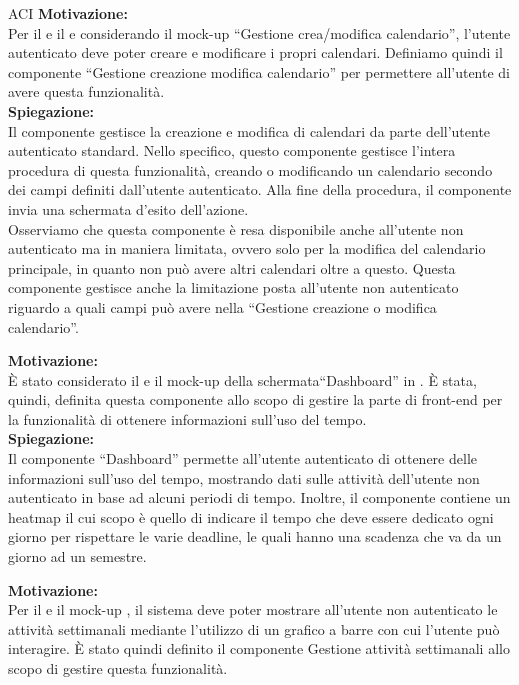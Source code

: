 \begin{listaPersonale}{ACI}
    \textbf{Motivazione:}\\
    Per il  e il  e considerando il mock-up  “Gestione crea/modifica calendario”, l'utente autenticato deve poter creare e modificare i propri calendari.
    Definiamo quindi il componente “Gestione creazione modifica calendario” per permettere all'utente di avere questa funzionalità.\\
    \textbf{Spiegazione:} \\Il componente gestisce la creazione e modifica di calendari da parte dell'utente autenticato standard. Nello specifico, questo componente gestisce l'intera procedura di questa funzionalità, creando o modificando un calendario secondo dei campi definiti dall'utente autenticato. Alla fine della procedura, il componente invia una schermata d'esito dell'azione.\\
    Osserviamo che questa componente è resa disponibile anche all'utente non autenticato ma in maniera limitata, ovvero solo per la modifica del calendario principale, in quanto non può avere altri calendari oltre a questo. Questa componente gestisce anche la limitazione posta all'utente non autenticato riguardo a quali campi può avere nella “Gestione creazione o modifica calendario”.



    \textbf{Motivazione:}\\
    È stato considerato il  e il mock-up della schermata“Dashboard” in . È stata, quindi, definita questa componente allo scopo di gestire la parte di front-end per la funzionalità di ottenere informazioni sull'uso del tempo.\\
    \textbf{Spiegazione:}\\
    Il componente “Dashboard” permette all'utente autenticato di ottenere delle informazioni sull'uso del tempo,  mostrando dati sulle attività dell'utente non autenticato in base ad alcuni periodi di tempo. Inoltre, il componente contiene un heatmap  il cui scopo è quello di indicare il tempo che deve essere dedicato ogni giorno per rispettare le varie deadline, le quali hanno una scadenza che va da un giorno ad un semestre.



    \textbf{Motivazione:}\\
    Per il  e il mock-up , il sistema deve poter mostrare all'utente non autenticato le attività settimanali mediante l'utilizzo di un grafico a barre con cui l'utente può interagire. È stato quindi definito il componente Gestione attività settimanali allo scopo di gestire questa funzionalità.\\


\end{listaPersonale}
